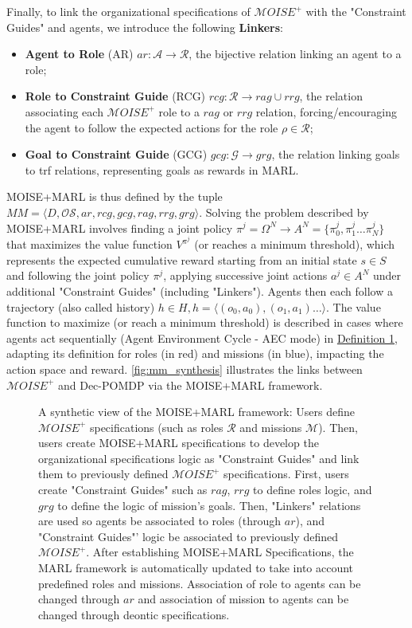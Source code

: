 \documentclass[sigconf,anonymous]{aamas}
\begin{document}
Finally, to link the organizational specifications of $\mathcal{M}OISE^+$ with the "Constraint Guides" and agents, we introduce the following \textbf{Linkers}:
\begin{itemize}
    \item \textbf{Agent to Role} (AR) \quad $ar: \mathcal{A} \to \mathcal{R}$, the bijective relation linking an agent to a role;
    \item \textbf{Role to Constraint Guide} (RCG) \quad $rcg: \mathcal{R} \rightarrow rag \cup rrg$, the relation associating each $\mathcal{M}OISE^+$ role to a $rag$ or $rrg$ relation, forcing/encouraging the agent to follow the expected actions for the role $\rho \in \mathcal{R}$;
    \item \textbf{Goal to Constraint Guide} (GCG) \quad $gcg: \mathcal{G} \rightarrow grg$, the relation linking goals to trf relations, representing goals as rewards in MARL.
\end{itemize}

MOISE+MARL is thus defined by the tuple $MM = \langle D, \mathcal{OS}, ar, rcg, \allowbreak gcg, rag, rrg, grg\rangle$. Solving the problem described by MOISE+MARL involves finding a joint policy $\pi^{j} = \Omega^{N} \to A^{N} = \{\pi^j_0,\pi^j_1\dots\pi^j_N\}$ that maximizes the value function $V^{\pi^{j}}$ (or reaches a minimum threshold), which represents the expected cumulative reward starting from an initial state $s \in S$ and following the joint policy $\pi^{j}$, applying successive joint actions $a^{j} \in A^N$ under additional "Constraint Guides" (including "Linkers"). Agents then each follow a trajectory (also called history) $h \in H, h = \langle(o_0,a_0), (o_1,a_1)\dots\rangle$. The value function to maximize (or reach a minimum threshold) is described in cases where agents act sequentially (Agent Environment Cycle - AEC mode) in \hyperref[eq:single_value_function]{Definition 1}, adapting its definition for roles (in red) and missions (in blue), impacting the action space and reward. \autoref{fig:mm_synthesis} illustrates the links between $\mathcal{M}OISE^+$ and Dec-POMDP via the MOISE+MARL framework.

\begin{figure*}[h!]
  \centering
  
  \caption{A synthetic view of the MOISE+MARL framework: Users define $\mathcal{M}OISE^+$ specifications (such as roles $\mathcal{R}$ and missions $\mathcal{M}$). Then, users create MOISE+MARL specifications to develop the organizational specifications logic as "Constraint Guides" and link them to previously defined $\mathcal{M}OISE^+$ specifications. First, users create "Constraint Guides" such as $rag$, $rrg$ to define roles logic, and $grg$ to define the logic of mission's goals. Then, "Linkers" relations are used so agents be associated to roles (through $ar$), and "Constraint Guides"' logic be associated to previously defined $\mathcal{M}OISE^+$. After establishing MOISE+MARL Specifications, the MARL framework is automatically updated to take into account predefined roles and missions. Association of role to agents can be changed through $ar$ and association of mission to agents can be changed through deontic specifications.}
  \label{fig:mm_synthesis}
\end{figure*}
\end{document}
